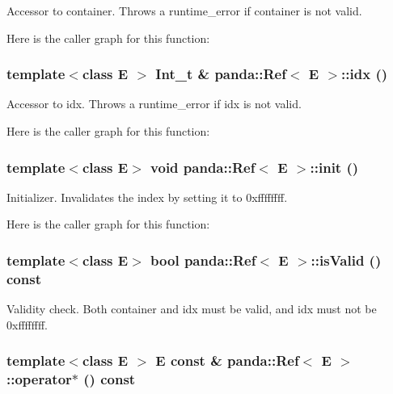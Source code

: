 Accessor to container. Throws a runtime\_\-error if container is not valid. 

Here is the caller graph for this function:\hypertarget{classpanda_1_1Ref_adc0eaedf3db52609635a3e09a395375a}{
\subsubsection[{idx}]{\setlength{\rightskip}{0pt plus 5cm}template$<$class E $>$ Int\_\-t \& {\bf panda::Ref}$<$ E $>$::idx ()}}
\label{classpanda_1_1Ref_adc0eaedf3db52609635a3e09a395375a}


Accessor to idx. Throws a runtime\_\-error if idx is not valid. 

Here is the caller graph for this function:\hypertarget{classpanda_1_1Ref_af378c309fd6b7945a4e18eea5e041a89}{
\subsubsection[{init}]{\setlength{\rightskip}{0pt plus 5cm}template$<$class E$>$ void {\bf panda::Ref}$<$ E $>$::init ()}}
\label{classpanda_1_1Ref_af378c309fd6b7945a4e18eea5e041a89}


Initializer. Invalidates the index by setting it to 0xffffffff. 

Here is the caller graph for this function:\hypertarget{classpanda_1_1Ref_a9260daa9c89d0775f2a1058a48e23bcb}{
\subsubsection[{isValid}]{\setlength{\rightskip}{0pt plus 5cm}template$<$class E$>$ bool {\bf panda::Ref}$<$ E $>$::isValid () const}}
\label{classpanda_1_1Ref_a9260daa9c89d0775f2a1058a48e23bcb}


Validity check. Both container and idx must be valid, and idx must not be 0xffffffff. \hypertarget{classpanda_1_1Ref_a2250860a67770a88aae27c82f3be2a11}{
\subsubsection[{operator$\ast$}]{\setlength{\rightskip}{0pt plus 5cm}template$<$class E $>$ E const \& {\bf panda::Ref}$<$ E $>$::operator$\ast$ () const}}
\label{classpanda_1_1Ref_a2250860a67770a88aae27c82f3be2a11}


